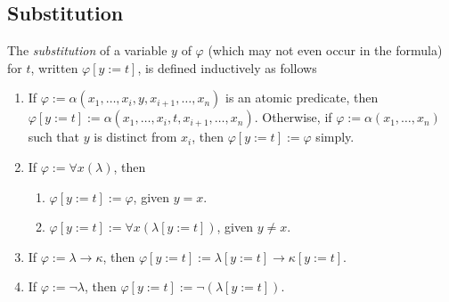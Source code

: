 \documentclass{treatise}
\begin{document}
\subsection{Substitution}
The \emph{substitution} of a variable $y$ of $\varphi$ (which may not even occur in the formula) for $t$, written $\varphi[y := t]$, is defined inductively as follows
\begin{enumerate}
    \item If $\varphi := \alpha(x_1, \hdots, x_i, y, x_{i + 1}, \hdots, x_n)$ is an atomic predicate, then $\varphi[y := t] := \alpha(x_1, \hdots, x_i, t, x_{i + 1}, \hdots, x_n)$. Otherwise, if $\varphi := \alpha(x_1, \hdots, x_n)$ such that $y$ is distinct from $x_i$, then $\varphi[y := t] := \varphi$ simply.
    \item If $\varphi := \forall x (\lambda)$, then
    \begin{enumerate}
        \item $\varphi[y := t] := \varphi$, given $y = x$.
        \item $\varphi[y := t] := \forall x (\lambda[y := t])$, given $y \neq x$.
    \end{enumerate}
    \item If $\varphi := \lambda \to \kappa$, then $\varphi[y := t] := \lambda[y := t] \to \kappa [y := t]$.
    \item If $\varphi := \neg\lambda$, then $\varphi[y := t] := \neg(\lambda[y := t])$.
\end{enumerate}
\end{document}
